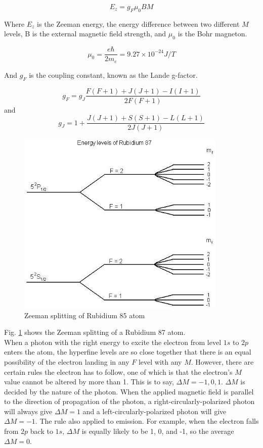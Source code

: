 \documentclass[prb,preprint]{revtex4-1}
\begin{document}
\begin{equation}
E_{z}=g_{F} \mu_{0} BM
\label{zeeman}
\end{equation}

Where $E_{z}$ is the Zeeman energy, the energy difference between two different $M$ levels, B is the external magnetic field strength, and $\mu_{0}$ is the Bohr magneton. 

\begin{equation}
\mu_{0}=\frac{e\hbar}{2m_{e}}=9.27\times10^{-24} J/T
\label{mu0}
\end{equation}

And $g_{F}$ is the coupling constant, known as the Lande g-factor. 

\begin{equation}
g_{F}=g_{J} \frac{F(F+1)+J(J+1)-I(I+1)}{2F(F+1)}
\label{gf}
\end{equation}
and
\begin{equation}
g_{J}=1+\frac{J(J+1)+S(S+1)-L(L+1)}{2J(J+1)}
\label{gj}
\end{equation}

\begin{figure}[h]
\centering
\includegraphics[width=10cm]{energylevels.jpg}
\caption{Zeeman splitting of Rubidium 85 atom \cite{energy}}
\label{energylevels}
\end{figure}

Fig. \ref{energylevels} shows the Zeeman splitting of a Rubidium 87 atom. \\

When a photon with the right energy to excite the electron from level $1s$ to $2p$ enters the atom, the hyperfine levels are so close together that there is an equal possibility of the electron landing in any $F$ level with any $M$. However, there are certain rules the electron has to follow, one of which is that the electron's $M$ value cannot be altered by more than 1. This is to say, $\Delta M=-1, 0, 1$. $\Delta M$ is decided by the nature of the photon. When the applied magnetic field is parallel to the direction of propagation of the photon, a right-circularly-polarized photon will always give $\Delta M=1$ and a left-circularly-polarized photon will give $\Delta M=-1$. The rule also applied to emission. For example, when the electron falls from $2p$ back to $1s$, $\Delta M$ is equally likely to be 1, 0, and -1, so the average $\Delta M=0$. \\
\end{document}
